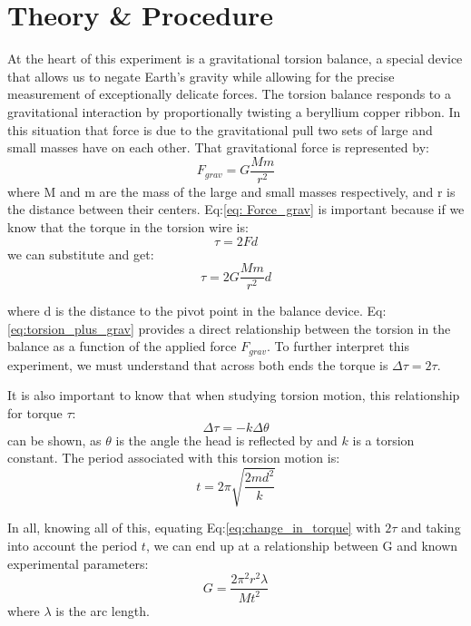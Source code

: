 \documentclass[a4paper,12pt,english]{all-in-one} %
\begin{document}
\section*{Theory \& Procedure}
{
At the heart of this experiment is a gravitational torsion balance, a special device that allows us to negate Earth's gravity while allowing for the precise measurement of exceptionally delicate forces. The torsion balance responds to a gravitational interaction by proportionally twisting a beryllium copper ribbon. In this situation that force is due to the gravitational pull two sets of large and small masses have on each other. That gravitational force is represented by:
\begin{equation}\label{eq: Force_grav}
    F_{grav} = G\frac{Mm}{r^2}
\end{equation}
where M and m are the mass of the large and small masses respectively, and
r is the distance between their centers. Eq:\eqref{eq: Force_grav} is important because if we know that the torque in the torsion wire is:
\begin{equation}\label{eq:torsion}
    \tau = 2Fd
\end{equation}
we can substitute and get:
\begin{equation}\label{eq:torsion_plus_grav}
    \tau = 2G\frac{Mm}{r^2}d
\end{equation}

where d is the distance to the pivot point in the balance device. Eq:\eqref {eq:torsion_plus_grav} provides a direct relationship between the torsion in the balance as a function of the applied force $F_{grav}$. To further interpret this experiment, we must understand that across both ends the torque is $\Delta\tau = 2\tau$.

It is also important to know that when studying torsion motion, this relationship for torque $\tau$:
\begin{equation}\label{eq:change_in_torque}
    \Delta\tau = -k\Delta\theta 
\end{equation}
can be shown, as $\theta$ is the angle the head is reflected by and $k$ is a torsion constant. The period associated with this torsion motion is:
\begin{equation}\label{eq:toursion_perios}
    t = 2\pi\sqrt{\frac{2md^2}{k}}
\end{equation}

In all, knowing all of this, equating Eq:\eqref{eq:change_in_torque} with $2\tau$ and taking into account the period $t$, we can end up at a relationship between G and known experimental parameters:
\begin{equation}\label{eq:grav_constant}
   G = \frac{2\pi^2r^2\lambda}{Mt^2}
\end{equation}
where $\lambda$ is the arc length.

}
\end{document}
